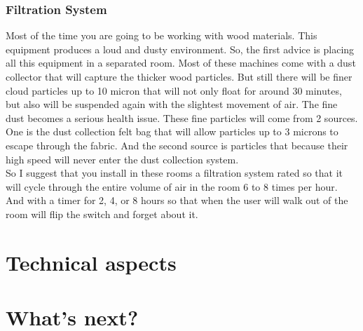 \documentclass[a4paper,12pt,titlepage]{article}
\begin{document}
\subsubsection*{Filtration System}
Most of the time you are going to be working with wood materials. This equipment
produces a loud and dusty environment. So, the first advice is
placing all this equipment in a separated room. Most of these machines come with
a dust collector that will capture the thicker wood particles. But still there will be finer cloud
particles up to 10 micron that will not only float for around 30 minutes, but also will be
suspended again with the slightest movement of air. The fine dust becomes a serious health issue. These
fine particles will come from 2 sources. One is the dust collection felt bag that will allow
particles up to 3 microns to escape through the fabric. And the second source is particles that because their high speed will never enter the dust collection system.\\

So I suggest that you install in these rooms a filtration system rated so that it will cycle through
the entire volume of air in the room 6 to 8 times per hour. And with a timer for 2, 4, or 8 hours
so that when the user will walk out of the room will flip the switch and forget about it.


\section{Technical aspects}

\section{What's next?}
\end{document}
